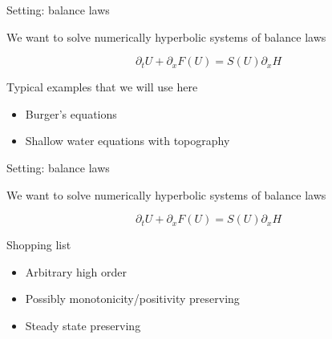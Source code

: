 
\begin{frame}[t]{Setting: balance laws}
\MyLogoa

\vspace{0.5cm}

We want to solve numerically  hyperbolic systems of balance laws

\begin{equation}
	\partial_tU+ \partial_x F(U)=  S(U)\partial_xH \nonumber
\end{equation}
 
\vspace{1.cm}

Typical examples  that we will use here


\begin{itemize}
\item Burger's equations 
\vspace{0.2cm}
\item Shallow water equations with topography
\end{itemize}


\end{frame}
 

\begin{frame}[t]{Setting: balance laws}
\MyLogoa

\vspace{0.5cm}

We want to solve numerically  hyperbolic systems of balance laws

\begin{equation}
	\partial_tU+ \partial_x F(U)=  S(U)\partial_xH \nonumber
\end{equation}
 
 
 \vspace{0.5cm}

Shopping list


\begin{itemize}
\item Arbitrary high order
\item  Possibly monotonicity/positivity preserving  
\item Steady state preserving 

\end{itemize}

\vspace{0.2cm}

  
 \end{frame}




